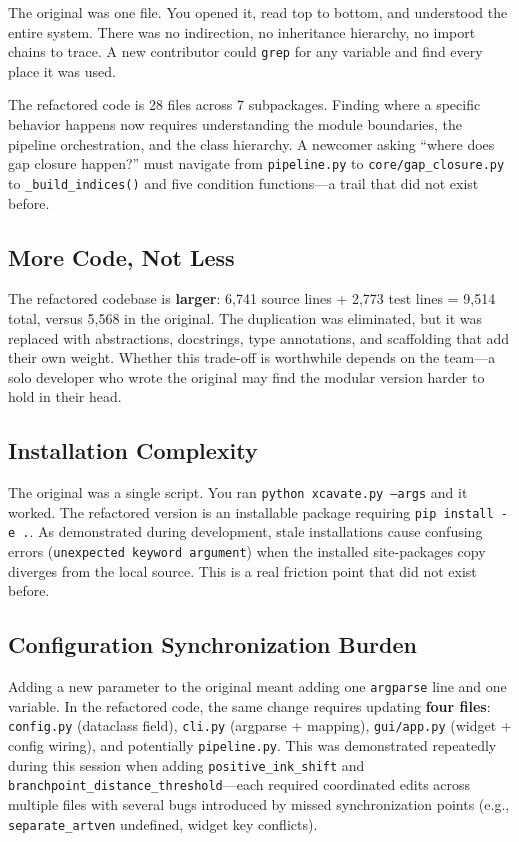 \documentclass[11pt,a4paper]{article}
\begin{document}
The original was one file. You opened it, read top to bottom, and understood the entire system. There was no indirection, no inheritance hierarchy, no import chains to trace. A new contributor could \texttt{grep} for any variable and find every place it was used.

The refactored code is 28 files across 7 subpackages. Finding where a specific behavior happens now requires understanding the module boundaries, the pipeline orchestration, and the class hierarchy. A newcomer asking ``where does gap closure happen?'' must navigate from \texttt{pipeline.py} to \texttt{core/gap\_closure.py} to \texttt{\_build\_indices()} and five condition functions---a trail that did not exist before.

\subsection{More Code, Not Less}

The refactored codebase is \textbf{larger}: 6,741 source lines + 2,773 test lines = 9,514 total, versus 5,568 in the original. The duplication was eliminated, but it was replaced with abstractions, docstrings, type annotations, and scaffolding that add their own weight. Whether this trade-off is worthwhile depends on the team---a solo developer who wrote the original may find the modular version harder to hold in their head.

\subsection{Installation Complexity}

The original was a single script. You ran \texttt{python xcavate.py --args} and it worked. The refactored version is an installable package requiring \texttt{pip install -e .}. As demonstrated during development, stale installations cause confusing errors (\texttt{unexpected keyword argument}) when the installed site-packages copy diverges from the local source. This is a real friction point that did not exist before.

\subsection{Configuration Synchronization Burden}

Adding a new parameter to the original meant adding one \texttt{argparse} line and one variable. In the refactored code, the same change requires updating \textbf{four files}: \texttt{config.py} (dataclass field), \texttt{cli.py} (argparse + mapping), \texttt{gui/app.py} (widget + config wiring), and potentially \texttt{pipeline.py}. This was demonstrated repeatedly during this session when adding \texttt{positive\_ink\_shift} and \texttt{branchpoint\_distance\_threshold}---each required coordinated edits across multiple files with several bugs introduced by missed synchronization points (e.g., \texttt{separate\_artven} undefined, widget key conflicts).
\end{document}
